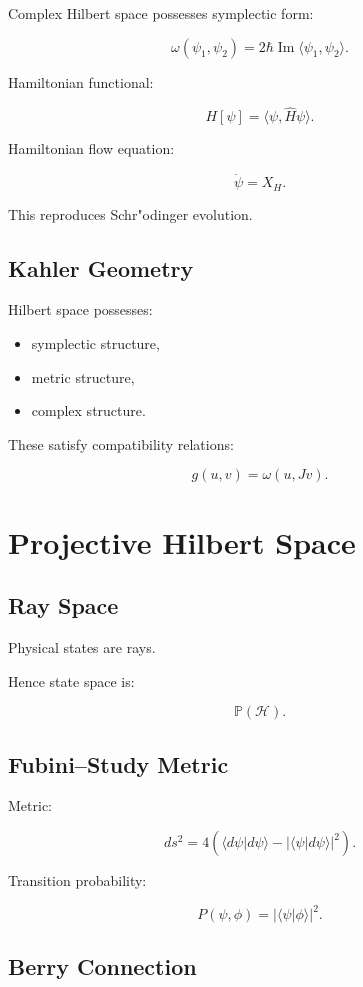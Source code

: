 \documentclass[11pt]{book}
\begin{document}
Complex Hilbert space possesses symplectic form:

\[
\omega(\psi_1,\psi_2)
=
2\hbar\operatorname{Im}
\langle \psi_1,\psi_2\rangle.
\]

Hamiltonian functional:

\[
H[\psi]
=
\langle \psi,\hat H\psi\rangle.
\]

Hamiltonian flow equation:

\[
\dot \psi = X_H.
\]

This reproduces Schr"odinger evolution.

\section{Kahler Geometry}

Hilbert space possesses:

\begin{itemize}
\item symplectic structure,
\item metric structure,
\item complex structure.
\end{itemize}

These satisfy compatibility relations:

\[
g(u,v)=\omega(u,Jv).
\]

\chapter{Projective Hilbert Space}

\section{Ray Space}

Physical states are rays.

Hence state space is:

\[
\mathbb P(\mathcal H).
\]

\section{Fubini--Study Metric}

Metric:

\[
ds^2
=
4
\left(
\langle d\psi|d\psi\rangle
-
|\langle\psi|d\psi\rangle|^2
\right).
\]

Transition probability:

\[
P(\psi,\phi)
=
|\langle \psi|\phi\rangle|^2.
\]

\section{Berry Connection}
\end{document}
